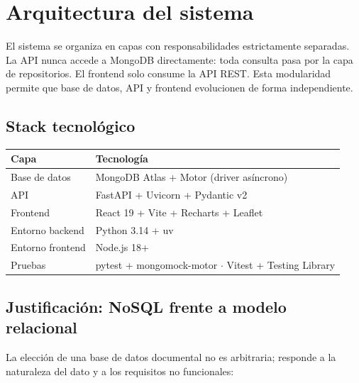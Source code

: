 \documentclass[12pt, letterpaper]{article}
\begin{document}
\section{Arquitectura del sistema}
El sistema se organiza en capas con responsabilidades estrictamente separadas.
La API nunca accede a MongoDB directamente: toda consulta pasa por la capa de
repositorios. El frontend solo consume la API REST. Esta modularidad permite que
base de datos, API y frontend evolucionen de forma independiente.

\subsection{Stack tecnológico}

\begin{center}
\begin{tabular}{@{}ll@{}}
\toprule
\textbf{Capa} & \textbf{Tecnología} \\
\midrule
Base de datos & MongoDB Atlas + Motor (driver asíncrono) \\
API & FastAPI + Uvicorn + Pydantic v2 \\
Frontend & React 19 + Vite + Recharts + Leaflet \\
Entorno backend & Python 3.14 + uv \\
Entorno frontend & Node.js 18+ \\
Pruebas & pytest + mongomock-motor $\cdot$ Vitest + Testing Library \\
\bottomrule
\end{tabular}
\end{center}

\subsection{Justificación: NoSQL frente a modelo relacional}
La elección de una base de datos documental no es arbitraria; responde a la
naturaleza del dato y a los requisitos no funcionales:
\end{document}
